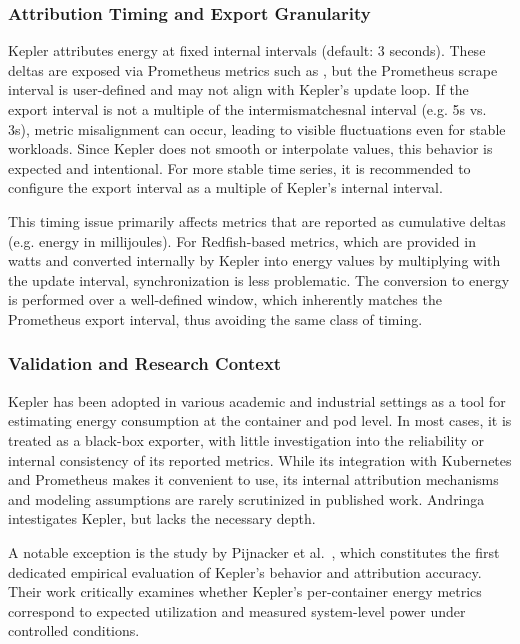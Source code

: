 \subsubsection{Attribution Timing and Export Granularity}
\label{sec:kepler-attribution-timing}

Kepler attributes energy at fixed internal intervals (default: 3 seconds). These deltas are exposed via Prometheus metrics such as , but the Prometheus scrape interval is user-defined and may not align with Kepler's update loop. If the export interval is not a multiple of the intermismatchesnal interval (e.g. 5s vs. 3s), metric misalignment can occur, leading to visible fluctuations even for stable workloads. Since Kepler does not smooth or interpolate values, this behavior is expected and intentional. For more stable time series, it is recommended to configure the export interval as a multiple of Kepler’s internal interval.

This timing issue primarily affects metrics that are reported as cumulative deltas (e.g. energy in millijoules). For Redfish-based metrics, which are provided in watts and converted internally by Kepler into energy values by multiplying with the update interval, synchronization is less problematic. The conversion to energy is performed over a well-defined window, which inherently matches the Prometheus export interval, thus avoiding the same class of timing.

\subsubsection{Validation and Research Context}

Kepler has been adopted in various academic and industrial settings as a tool for estimating energy consumption at the container and pod level. In most cases, it is treated as a black-box exporter, with little investigation into the reliability or internal consistency of its reported metrics. While its integration with Kubernetes and Prometheus makes it convenient to use, its internal attribution mechanisms and modeling assumptions are rarely scrutinized in published work. Andringa\parencite{andringa2024estimating} intestigates Kepler, but lacks the necessary depth.

A notable exception is the study by Pijnacker et al.~\parencite{pijnackerEstimatingContainerlevelPower2024,pijnackerContainerlevelEnergyObservability2025}, which constitutes the first dedicated empirical evaluation of Kepler’s behavior and attribution accuracy. Their work critically examines whether Kepler’s per-container energy metrics correspond to expected utilization and measured system-level power under controlled conditions.

